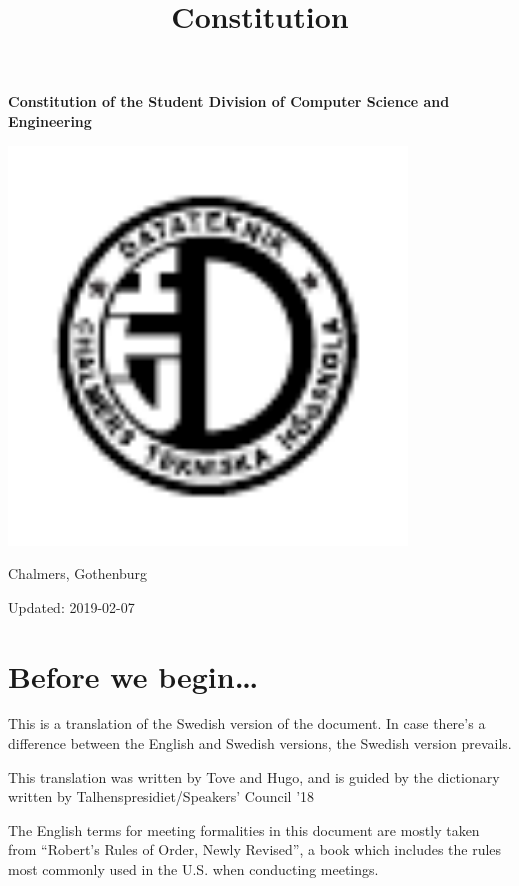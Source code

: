 \documentclass[a4paper]{dtek}
\title{Constitution}
\newcommand{\sdocsae}{Student Division of Computer Science and Engineering~}
\newcommand{\updated}{2019-02-07} %
\begin{document}
\makeheadfoot

\vspace*{\fill}
\begin{center}
{\Huge \textbf{Constitution of the \sdocsae}}
\par\bigskip
\includegraphics[width=300pt]{dteklogo.pdf}
\par\bigskip
{\LARGE Chalmers, Gothenburg}
\end{center}
\vspace*{\fill}
\begin{center}
{\LARGE Updated: \updated}
\end{center}
\vspace*{\fill}


\newpage
\setcounter{tocdepth}{1}
\tableofcontents
\newpage


\setcounter{section}{-1}
\section{Before we begin\dots}
This is a translation of the Swedish version of the document. In case there's a difference between the English and Swedish versions, the Swedish version prevails.

This translation was written by Tove and Hugo, and is guided by the dictionary written by Talhenspresidiet/Speakers' Council '18

The English terms for meeting formalities in this document are mostly taken from ``Robert's Rules of Order, Newly Revised'', a book which includes the rules most commonly used in the U.S. when conducting meetings.
\end{document}
